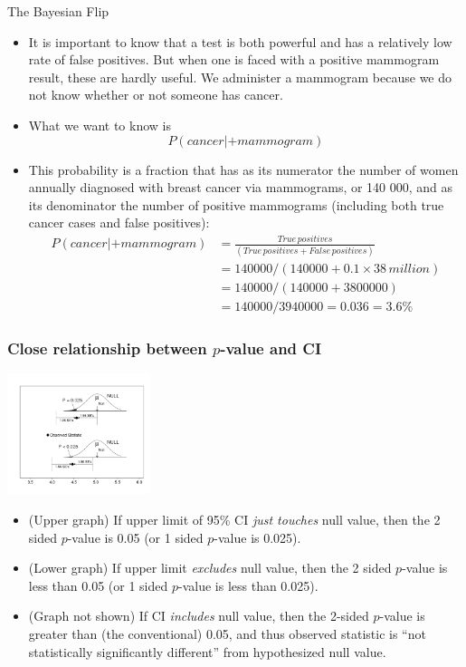 \documentclass[10pt]{beamer}\usepackage[]{graphicx}\usepackage[]{color}
\begin{document}
\begin{frame}{The Bayesian Flip}
	
	\begin{itemize}
		\item It is important to know that
		a test is both powerful and has a relatively low
		rate of false positives. But when one is faced
		with a positive mammogram result, these are
		hardly useful. We administer a mammogram
		because we do not know whether or not
		someone has cancer.
		\item What we want to know is
		$$P(cancer | +mammogram)$$ \pause 
		\item This probability is a fraction
		that has as its numerator the number of
		women annually diagnosed with breast
		cancer via mammograms, or 140 000, and
		as its denominator the number of positive
		mammograms (including both true cancer
		cases and false positives):
		\begin{align*}
			P(cancer | +mammogram) &= \frac{True\, positives}{(True\,positives + False\, positives)} \\
			&= 140 000 / (140 000 + 0.1 × 38\,million)
			\\
			&= 140 000 / (140 000 + 3 800 000)
			\\
			&= 140 000 / 3 940 000 = 0.036 = 3.6\%
		\end{align*}
	\end{itemize}
	
\end{frame}




\begin{frame}
	\frametitle{Close relationship between $p$-value and CI}
	\begin{center}
		\includegraphics[width=1.65in]{P-CI.pdf}
	\end{center} 
	\begin{footnotesize}
		\begin{itemize}
			\item
			(Upper graph) If upper limit of 95\% CI\textit{ just touches} null value, then
			the 2 sided $p$-value is 0.05 (or 1 sided $p$-value is 0.025). 
			\item
			(Lower graph) If upper limit \textit{excludes} null value, then
			the 2 sided $p$-value is less than 0.05 (or 1 sided $p$-value is less than 0.025). 
			\item
			(Graph not shown) If  CI \textit{includes} null value, then the 2-sided $p$-value is greater than (the conventional) 0.05, and thus observed statistic is ``not statistically significantly different'' from hypothesized null value. 
		\end{itemize}
	\end{footnotesize}
\end{frame}
\end{document}

